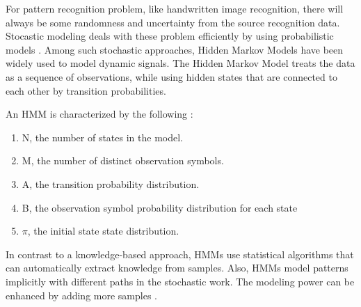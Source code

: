 
For pattern recognition problem, like handwritten image recognition, there will  always be some randomness and uncertainty from the source recognition data. 
Stocastic modeling deals with these problem efficiently by using probabilistic models \cite{Cho1995}.  
Among such stochastic approaches, Hidden Markov Models have been widely used to model dynamic signals.
The Hidden Markov Model treats the data as a sequence of observations, while using hidden states that are connected to each other by transition probabilities.
 
An HMM is characterized by the following \cite{Rabiner1989}:
\begin{enumerate}
\item	N, the number of states in the model.
\item	M, the number of distinct observation symbols. %
\item	A, the transition probability distribution.
\item	B, the observation symbol probability distribution for each state
\item	$\pi$, the initial state state distribution.
\end{enumerate}

In contrast to a knowledge-based approach, HMMs use statistical algorithms that can automatically extract knowledge from samples. 
Also, HMMs model patterns implicitly with different paths in the stochastic work. 
The modeling power can be enhanced by adding more samples \cite{Cho1995}.
